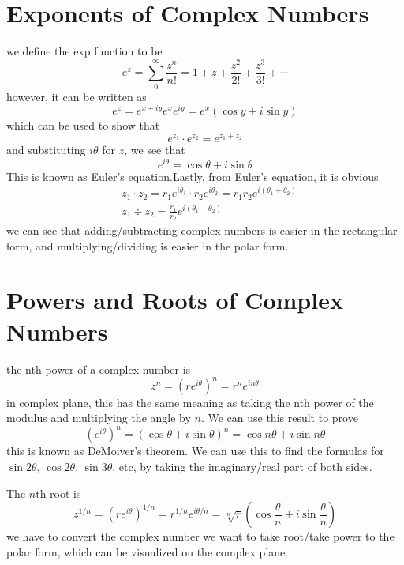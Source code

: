 \documentclass[oneside]{book}
\numberwithin{equation}{chapter} %
\begin{document}
\section{Exponents of Complex Numbers}
we define the exp function to be 
\begin{equation}
	e^z=\sum^\infty_0\frac{z^n}{n!}=1+z+\frac{z^2}{2!}+\frac{z^3}{3!}+\cdots
\end{equation}
however, it can be written as 
\begin{equation}
	e^z=e^{x+iy}e^xe^{iy}=e^x(\cos y+i\sin y)
\end{equation}
which can be used to show that 
$$e^{z_1}\cdot e^{z_2}=e^{z_1+z_2}$$
and substituting $i\theta$ for $z$, we see that 
\begin{equation}
	e^{i\theta}=\cos\theta+i\sin\theta
\end{equation}
This is known as Euler's equation.Lastly, from Euler's equation, it is obvious 
\begin{align}
	&z_1\cdot z_2=r_1e^{i\theta_1}\cdot r_2e^{i\theta_2}=r_1r_2e^{i(\theta_1+\theta_2)}\\
	&z_1\div z_2=\frac{r_1}{r_2}e^{i(\theta_1-\theta_2)}
\end{align}
we can see that adding/subtracting complex numbers is easier in the rectangular form, and multiplying/dividing is easier in the polar form.
\section{Powers and Roots of Complex Numbers}
the nth power of a complex number is 
\begin{equation}
	z^n=(re^{i\theta})^n=r^ne^{in\theta}
\end{equation}
in complex plane, this has the same meaning as taking the nth power of the modulus and multiplying the angle by $n$. We can use this result to prove 
\begin{equation}
	(e^{i\theta})^n=(\cos\theta+i\sin\theta)^n=\cos n\theta+i\sin n\theta
\end{equation}
this is known as DeMoiver's theorem. We can use this to find the formulas for $\sin 2\theta$, $\cos 2\theta$, $\sin 3\theta$, etc, by taking the imaginary/real part of both sides.

The $n$th root is 
\begin{equation}
	z^{1/n}=(re^{i\theta})^{1/n}=r^{1/n}e^{i\theta/n}=\sqrt[n]{r}\left(\cos\frac{\theta}n+i\sin\frac\theta n\right)
\end{equation}
we have to convert the complex number we want to take root/take power to the polar form, which can be visualized on the complex plane. 
\end{document}
